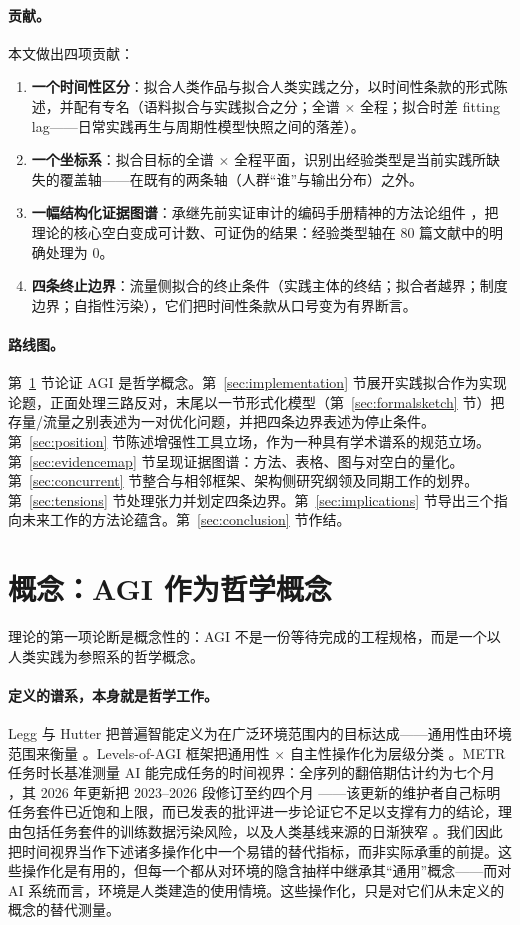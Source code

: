 \documentclass[10pt,fontset=fandol]{ctexart}
\begin{document}
\paragraph{贡献。}
本文做出四项贡献：
\begin{enumerate}
\item \textbf{一个时间性区分}：拟合人类作品与拟合人类实践之分，以时间性条款的形式陈述，并配有专名（语料拟合与实践拟合之分；全谱 $\times$ 全程；拟合时差 fitting lag——日常实践再生与周期性模型快照之间的落差）。
\item \textbf{一个坐标系}：拟合目标的全谱 $\times$ 全程平面，识别出经验类型是当前实践所缺失的覆盖轴——在既有的两条轴（人群“谁”与输出分布）之外。
\item \textbf{一幅结构化证据图谱}：承继先前实证审计的编码手册精神的方法论组件 \cite{yu2026failure}，把理论的核心空白变成可计数、可证伪的结果：经验类型轴在 80 篇文献中的明确处理为 0。
\item \textbf{四条终止边界}：流量侧拟合的终止条件（实践主体的终结；拟合者越界；制度边界；自指性污染），它们把时间性条款从口号变为有界断言。
\end{enumerate}

\paragraph{路线图。}
第~\ref{sec:concept} 节论证 AGI 是哲学概念。第~\ref{sec:implementation} 节展开实践拟合作为实现论题，正面处理三路反对，末尾以一节形式化模型（第~\ref{sec:formalsketch} 节）把存量/流量之别表述为一对优化问题，并把四条边界表述为停止条件。第~\ref{sec:position} 节陈述增强性工具立场，作为一种具有学术谱系的规范立场。第~\ref{sec:evidencemap} 节呈现证据图谱：方法、表格、图与对空白的量化。第~\ref{sec:concurrent} 节整合与相邻框架、架构侧研究纲领及同期工作的划界。第~\ref{sec:tensions} 节处理张力并划定四条边界。第~\ref{sec:implications} 节导出三个指向未来工作的方法论蕴含。第~\ref{sec:conclusion} 节作结。

\section{概念：AGI 作为哲学概念}\label{sec:concept}

理论的第一项论断是概念性的：AGI 不是一份等待完成的工程规格，而是一个以人类实践为参照系的哲学概念。\paragraph{定义的谱系，本身就是哲学工作。}
Legg 与 Hutter 把普遍智能定义为在广泛环境范围内的目标达成——通用性由环境范围来衡量 \cite{legg2007universal}。Levels-of-AGI 框架把通用性 $\times$ 自主性操作化为层级分类 \cite{morris2023levels}。METR 任务时长基准测量 AI 能完成任务的时间视界：全序列的翻倍期估计约为七个月 \cite{kwa2025measuring}，其 2026 年更新把 2023--2026 段修订至约四个月 \cite{metr2026th11}——该更新的维护者自己标明任务套件已近饱和上限，而已发表的批评进一步论证它不足以支撑有力的结论，理由包括任务套件的训练数据污染风险，以及人类基线来源的日渐狭窄 \cite{witkin2026metr}。我们因此把时间视界当作下述诸多操作化中一个易错的替代指标，而非实际承重的前提。这些操作化是有用的，但每一个都从对环境的隐含抽样中继承其“通用”概念——而对 AI 系统而言，环境是人类建造的使用情境。这些操作化，只是对它们从未定义的概念的替代测量。
\end{document}
